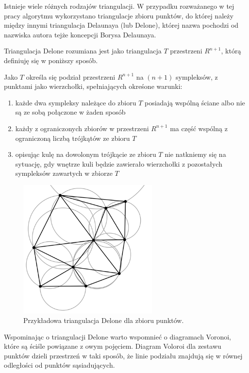 Istnieje wiele różnych rodzajów triangulacji. W przypadku rozważanego w tej pracy algorytmu wykorzystano triangulacje zbioru punktów, do której należy między innymi triangulacja Delaunaya (lub Delone), której nazwa pochodzi od nazwiska autora tejże koncepcji Borysa Delaunaya. 

Triangulacja Delone \cite{tDelone} rozumiana jest jako triangulacja $T$ przestrzeni $R^{n+1}$, którą definiuję się w poniższy sposób.

Jako $T$ określa się podział przestrzeni $R^{n+1}$ na $(n+1)$ sympleksów, z punktami jako wierzchołki, spełniających okreśone warunki:

\begin{enumerate}
    \item każde dwa sympleksy należące do zbioru $T$ posiadają wspólną ściane albo nie są ze sobą połączone w żaden sposób
    \item każdy z ograniczonych zbiorów w przestrzeni $R^{n+1}$ ma część wspólną z ograniczoną liczbą trójkątów ze zbioru $T$
    \item opisując kulę na dowolonym trójkącie ze zbioru $T$ nie natkniemy się na sytuację, gdy wnętrze kuli będzie zawierało wierzchołki z pozostałych sympleksów zawartych w zbiorze $T$
\end{enumerate}

\begin{figure}[h]
	\centering
	\includegraphics[width=7cm]{triangulation.png}
	\caption{Przykładowa triangulacja Delone dla zbioru punktów. \cite{tDelone}}
	\label{fig:delone}
\end{figure}

Wspominając o triangulacji Delone warto wspomnieć o diagramach Voronoi, które są ściśle powiązane z owym pojęciem. Diagram Voloroi dla zestawu punktów dzieli przestrzeń w taki sposób, że linie podziału znajdują się w równej odległości od punktów sąsiadujących.

